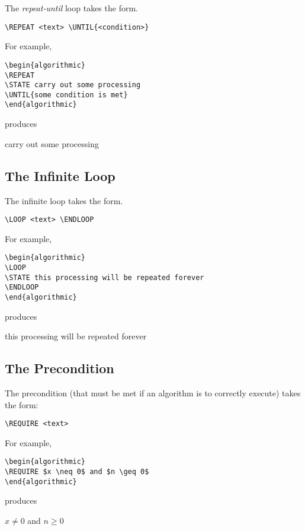 \documentclass{article}
\begin{document}
The \emph{repeat-until} loop takes the form.
\begin{verbatim}
\REPEAT <text> \UNTIL{<condition>}
\end{verbatim}
For example,
\begin{verbatim}
\begin{algorithmic}
\REPEAT
\STATE carry out some processing 
\UNTIL{some condition is met}
\end{algorithmic}
\end{verbatim}
produces
\begin{algorithmic}
  \REPEAT
  \STATE carry out some processing 
\end{algorithmic}

\subsection{The Infinite Loop}

The infinite loop takes the form.
\begin{verbatim}
\LOOP <text> \ENDLOOP
\end{verbatim}
For example,
\begin{verbatim}
\begin{algorithmic}
\LOOP
\STATE this processing will be repeated forever
\ENDLOOP
\end{algorithmic}
\end{verbatim}
produces
\begin{algorithmic}
  \LOOP
  \STATE this processing will be repeated forever
  \ENDLOOP
\end{algorithmic}

\subsection{The Precondition}

The precondition (that must be met if an algorithm is to correctly
execute) takes the form:
\begin{verbatim}
\REQUIRE <text>
\end{verbatim}
For example,
\begin{verbatim}
\begin{algorithmic}
\REQUIRE $x \neq 0$ and $n \geq 0$
\end{algorithmic}
\end{verbatim}
produces
\begin{algorithmic}
  \REQUIRE $x \neq 0$ and $n \geq 0$
\end{algorithmic}
\end{document}
